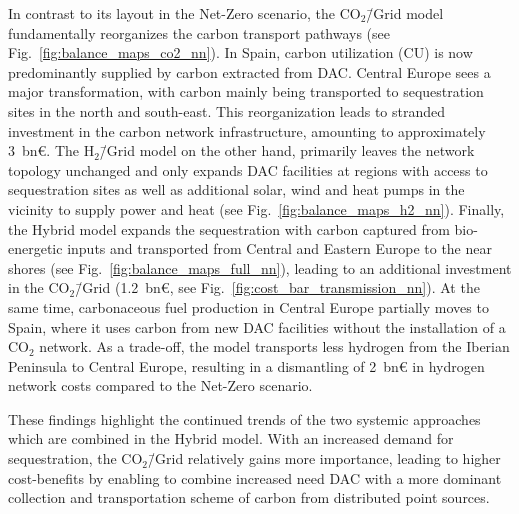 \documentclass[twocolumn]{article}
\newcommand{\COtwo}{CO$_2$}
\newcommand{\modH}{H$_2$\=/Grid model}
\newcommand{\modHybrid}{Hybrid model}
\newcommand{\carbongrid}{CO$_2$\=/Grid}
\newcommand{\carbonmodel}{CO$_2$\=/Grid model}
\newcommand{\hybridmodel}{Hybrid model}
\begin{document}
In contrast to its layout in the Net-Zero scenario, the \carbonmodel{} fundamentally reorganizes the carbon transport pathways (see Fig.~\ref{fig:balance_maps_co2_nn}).
In Spain, carbon utilization (CU) is now predominantly supplied by carbon extracted from DAC. Central Europe sees a major transformation, with carbon mainly being transported to sequestration sites in the north and south-east. This reorganization leads to stranded investment in the carbon network infrastructure, amounting to approximately 3~bn€.
%
The \modH{} on the other hand, primarily leaves the network topology unchanged and only expands DAC facilities at regions with access to sequestration sites as well as additional solar, wind and heat pumps in the vicinity to supply power and heat (see Fig.~\ref{fig:balance_maps_h2_nn}).
%
Finally, the \modHybrid{} expands the sequestration with carbon captured from bio-energetic inputs and transported from Central and Eastern Europe to the near shores (see Fig.~\ref{fig:balance_maps_full_nn}), leading to an additional investment in the \carbongrid{} (1.2~bn€, see Fig.~\ref{fig:cost_bar_transmission_nn}). At the same time, carbonaceous fuel production in Central Europe partially moves to Spain, where it uses carbon from new DAC facilities without the installation of a \COtwo{} network. As a trade-off, the model transports less hydrogen from the Iberian Peninsula to Central Europe, resulting in a dismantling of 2~bn€ in hydrogen network costs compared to the Net-Zero scenario.

These findings highlight the continued trends of the two systemic approaches which are combined in the \hybridmodel. With an increased demand for sequestration, the \carbongrid{} relatively gains more importance, leading to higher cost-benefits by enabling to combine increased need DAC with a more dominant collection and transportation scheme of carbon from distributed point sources.
\end{document}
